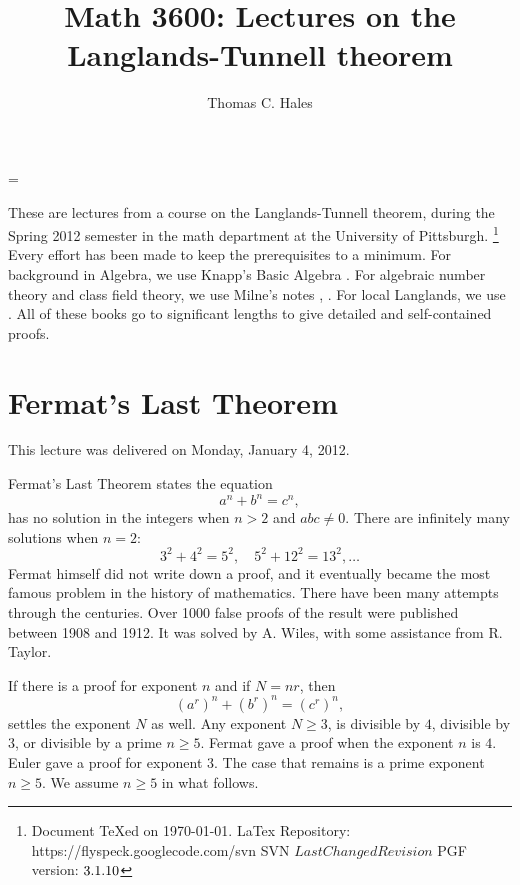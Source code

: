 \documentclass{amsart}
\def\svninfo{%
  \noindent
  Document TeXed on \today. \hfill\break
  LaTex Repository: https://flyspeck.googlecode.com/svn \hfill\break
  SVN $LastChangedRevision$\hfill\break
  PGF version: $\pgftypesetversion$
  }
\begin{document}
\title{Math 3600: Lectures on the Langlands-Tunnell theorem}
\author{Thomas C. Hales}
\maketitle


    \tableofcontents





\parindent=0pt
\parskip=\baselineskip
\def\seg{~~~}
\def\text{\hbox}

These are lectures from a course on the Langlands-Tunnell theorem, during
the Spring 2012 semester in the math department at the University of Pittsburgh.%
\footnote{\svninfo}
Every effort has been made to keep the prerequisites to a minimum.
For background in Algebra, we use Knapp's Basic Algebra \cite{knapp-basic}.
For algebraic number theory and class field theory, 
we use Milne's notes 
\cite{ANT}, \cite{CFT}.  For local Langlands, we use \cite{bushnell-henniart}.
All of these books go to significant lengths to give detailed and self-contained 
proofs.

\section{Fermat's Last Theorem}

This lecture was delivered on Monday, January 4, 2012.

Fermat's Last Theorem \cite{DDT} states the equation
\[
a^n + b^n = c^n,
\]
has no solution in the integers when $n>2$ and $abc\ne 0$.  There are
infinitely many solutions when $n=2$:
\[
3^2 + 4^2 = 5^2,\quad 5^2 + 12^2 = 13^2, \ldots
\]
Fermat himself did not write down a proof, and it eventually became
the most famous problem in the history of mathematics.  There have
been many attempts through the centuries.  Over 1000 false proofs of
the result were published between 1908 and 1912.  It was solved by
A. Wiles, with some assistance from R. Taylor.

If there is a proof for exponent $n$ and if $N = n r$, then
\[
(a^r)^n + (b^r)^n = (c^r)^n,
\]
settles the exponent $N$ as well.  Any exponent $N\ge3$, is divisible
by $4$, divisible by $3$, or divisible by a prime $n\ge 5$.  Fermat
gave a proof when the exponent $n$ is $4$.  Euler gave a proof for
exponent $3$.  The case that remains is a prime exponent $n\ge 5$.  We
assume $n\ge5$ in what follows.
\end{document}
